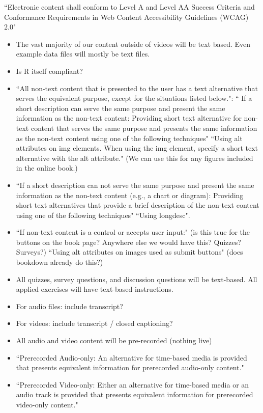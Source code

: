 \documentclass[pdftex,english,11pt,parskip=half]{scrartcl}
\begin{document}
``Electronic content shall conform to Level A and Level AA Success Criteria and Conformance Requirements in Web Content Accessibility Guidelines (WCAG) 2.0"

\begin{itemize}
\item The vast majority of our content outside of videos will be text based. Even example data files will mostly be text files.
\item Is R itself compliant?
\item ``All non-text content that is presented to the user has a text alternative that serves the equivalent purpose, except for the situations listed below.": `` If a short description can serve the same purpose and present the same information as the non-text content: Providing short text alternative for non-text content that serves the same purpose and presents the same information as the non-text content using one of the following techniques" ``Using alt attributes on img elements. When using the img element, specify a short text alternative with the alt attribute." (We can use this for any figures included in the online book.)
\item ``If a short description can not serve the same purpose and present the same information as the non-text content (e.g., a chart or diagram): Providing short text alternatives that provide a brief description of the non-text content using one of the following techniques" ``Using longdesc".
\item ``If non-text content is a control or accepts user input:" (is this true for the buttons on the book page? Anywhere else we would have this? Quizzes? Surveys?) ``Using alt attributes on images used as submit buttons" (does bookdown already do this?)
\item All quizzes, survey questions, and discussion questions will be text-based. All applied exercises will have text-based instructions.
\item For audio files: include transcript?
\item For videos: include transcript / closed captioning?
\item All audio and video content will be pre-recorded (nothing live)
\item ``Prerecorded Audio-only: An alternative for time-based media is provided that presents equivalent information for prerecorded audio-only content."
\item ``Prerecorded Video-only: Either an alternative for time-based media or an audio track is provided that presents equivalent information for prerecorded video-only content."

\end{itemize}
\end{document}
